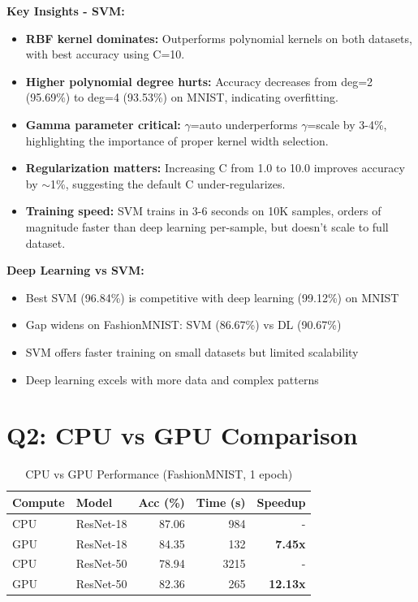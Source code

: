 \documentclass[conference]{IEEEtran}
\begin{document}
\textbf{Key Insights - SVM:}
\begin{itemize}
    \item \textbf{RBF kernel dominates:} Outperforms polynomial kernels on both datasets, with best accuracy using C=10.
    \item \textbf{Higher polynomial degree hurts:} Accuracy decreases from deg=2 (95.69\%) to deg=4 (93.53\%) on MNIST, indicating overfitting.
    \item \textbf{Gamma parameter critical:} $\gamma$=auto underperforms $\gamma$=scale by 3-4\%, highlighting the importance of proper kernel width selection.
    \item \textbf{Regularization matters:} Increasing C from 1.0 to 10.0 improves accuracy by $\sim$1\%, suggesting the default C under-regularizes.
    \item \textbf{Training speed:} SVM trains in 3-6 seconds on 10K samples, orders of magnitude faster than deep learning per-sample, but doesn't scale to full dataset.
\end{itemize}

\textbf{Deep Learning vs SVM:}
\begin{itemize}
    \item Best SVM (96.84\%) is competitive with deep learning (99.12\%) on MNIST
    \item Gap widens on FashionMNIST: SVM (86.67\%) vs DL (90.67\%)
    \item SVM offers faster training on small datasets but limited scalability
    \item Deep learning excels with more data and complex patterns
\end{itemize}

\section{Q2: CPU vs GPU Comparison}

\begin{table}[h]
\centering
\caption{CPU vs GPU Performance (FashionMNIST, 1 epoch)}
\label{tab:cpugpu}
\begin{tabular}{llrrr}
\toprule
Compute & Model & Acc (\%) & Time (s) & Speedup \\
\midrule
CPU & ResNet-18 & 87.06 & 984 & - \\
GPU & ResNet-18 & 84.35 & 132 & \textbf{7.45x} \\
CPU & ResNet-50 & 78.94 & 3215 & - \\
GPU & ResNet-50 & 82.36 & 265 & \textbf{12.13x} \\
\bottomrule
\end{tabular}
\end{table}
\end{document}
